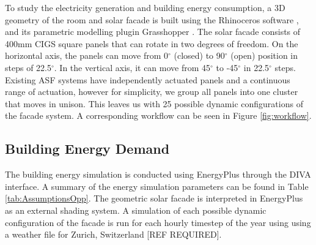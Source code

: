 
To study the electricity generation and building energy consumption, a 3D geometry of the room and solar facade is built using the Rhinoceros software \cite{Rhino}, and its parametric modelling plugin Grasshopper \cite{grasshopper}. The solar facade consists of 400mm CIGS square panels that can rotate in two degrees of freedom. On the horizontal axis, the panels can move from 0$^{\circ}$ (closed) to 90$^{\circ}$ (open) position in steps of 22.5$^{\circ}$. In the vertical axis, it can move from 45$^{\circ}$ to -45$^{\circ}$ in 22.5$^{\circ}$ steps. Existing ASF systems \cite{nagy2015frontiers} have independently actuated panels and a continuous range of actuation, however for simplicity, we group all panels into one cluster that moves in unison. This leaves us with 25 possible dynamic configurations of the facade system. A corresponding workflow can be seen in Figure \ref{fig:workflow}. 

\subsection{Building Energy Demand}

The building energy simulation is conducted using EnergyPlus \cite{energyplus} through the DIVA \cite{DIVA} interface. A summary of the energy simulation parameters can be found in Table \ref{tab:AssumptionsOpp}. The geometric solar facade is interpreted in EnergyPlus as an external shading system. A simulation of each possible dynamic configuration of the facade is run for each hourly timestep of the year using using a weather file for Zurich, Switzerland [REF REQUIRED].

